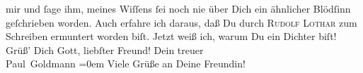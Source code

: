 \begin{ledgroupsized}[t]{13cm}
               mir und ſage ihm, meines Wiſſens ſei noch nie über Dich ein ähnlicher Blödſinn
               geſchrieben worden. Auch erfahre ich daraus, daß  Du
                  {\pb}durch \textsc{Rudolf Lothar} zum Schreiben ermuntert worden biſt. Jetzt weiß ich, warum Du ein Dichter
               biſt!\pend
           \pstart
           Grüß’ Dich Gott, liebſter Freund!\pend
           \pstart
           Dein treuer {\\[\baselineskip]}\spacefill\mbox{Paul Goldmann}\pend
           \leftskip=0em{}\pstart
           \noindent{}Viele Grüße an Deine Freundin!\pend
           
         
         \endnumbering{}\end{ledgroupsized}  \newcommand{\dateiname}{L02858}\newcommand{\titel}{Paul Goldmann an Arthur Schnitzler, 25. 9. 1898}\newcommand{\editorInnen}{Martin Anton Müller und Laura Untner}
      